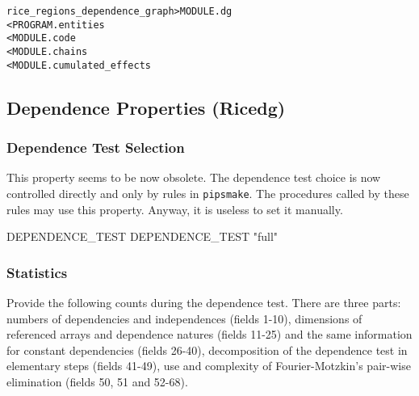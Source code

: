 \documentclass[a4paper]{report}
\newenvironment{PipsMake}{\begin{alltt}}{\end{alltt}}
\newcommand{\Pipsmake}{\texttt{pipsmake}}
\begin{document}
\begin{PipsMake}
rice_regions_dependence_graph      > MODULE.dg
        < PROGRAM.entities
        < MODULE.code
        < MODULE.chains
        < MODULE.cumulated_effects
\end{PipsMake}


\subsection{Dependence Properties (Ricedg)}


\subsubsection{Dependence Test Selection}

This property seems to be now obsolete. The dependence test choice is
now controlled directly and only by rules in \Pipsmake{}. The procedures
called by these rules may use this property. Anyway, it is useless to
set it manually.

\begin{PipsProp}{DEPENDENCE_TEST}
DEPENDENCE_TEST "full"
\end{PipsProp}


\subsubsection{Statistics}

Provide the following counts during the dependence test. There are three
parts: numbers of dependencies and independences (fields 1-10),
dimensions of referenced arrays and dependence natures (fields 11-25)
and the same information for constant dependencies (fields 26-40),
decomposition of the dependence test in elementary steps (fields 41-49),
use and complexity of Fourier-Motzkin's pair-wise elimination (fields
50, 51 and 52-68).
\end{document}
